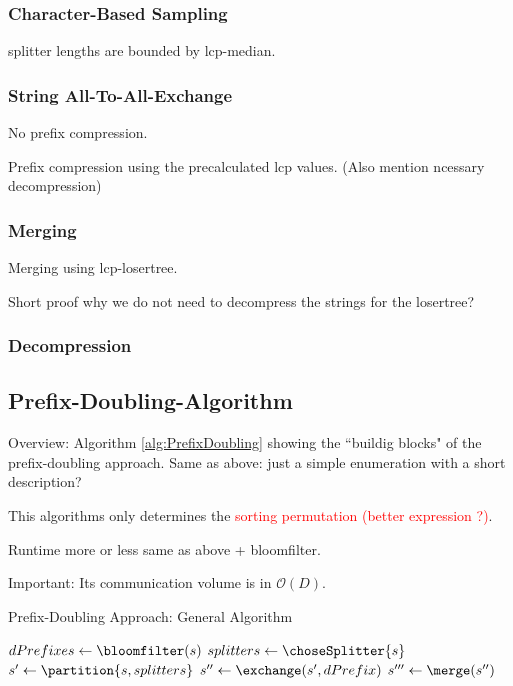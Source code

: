 \documentclass[12pt,a4paper,twoside]{scrartcl}
\numberwithin{equation}{section}
\begin{document}
\subsubsection{Character-Based Sampling}

splitter lengths are bounded by lcp-median.

\subsubsection{String All-To-All-Exchange}

No prefix compression.

Prefix compression using the precalculated lcp values. (Also mention ncessary decompression)

\subsubsection{Merging}

Merging using lcp-losertree. 

Short proof why we do not need to decompress the strings for the losertree?

\subsubsection{Decompression}


\subsection{Prefix-Doubling-Algorithm}

Overview: Algorithm \ref{alg:PrefixDoubling} showing the ``buildig blocks" of the prefix-doubling approach. Same as above: just a simple enumeration with a short description?

This algorithms only determines the \textcolor{red}{sorting permutation (better expression ?)}. 

Runtime more or less same as above + bloomfilter.

Important: Its communication volume is in $\mathcal{O}(D)$.
\begin{algorithm}
	\caption{Prefix-Doubling Approach: General Algorithm}\label{alg:PrefixDoubling}
	\BlankLine
	 
	$dPrefixes \leftarrow \bloomfilter(s)$ 
	$splitters \leftarrow \choseSplitter{s}$ 
	$s' \leftarrow \partition{s, splitters}$ 
	$s'' \leftarrow \exchange(s', dPrefix)$ \; 
	$s''' \leftarrow \merge(s'')$
	
	
\end{algorithm}
\end{document}
